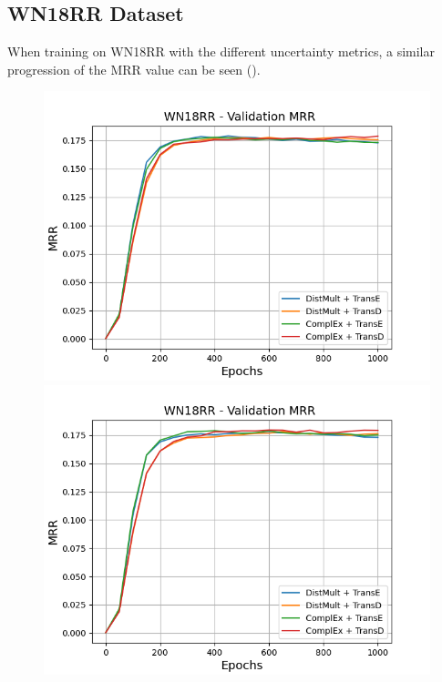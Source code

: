 \subsection{WN18RR Dataset}
\label{subsec:metrics_wn18rr}


When training \ucgan on \textsc{WN18RR} with the different uncertainty metrics, a similar progression of the MRR value can be seen ().
\begin{figure}
    \centering
    \begin{minipage}{.5\textwidth}
      \centering
      \includegraphics[width=0.9\linewidth]{figures/results/gan_train/not_pretrained/uncertainty/max_distribution/entropy/wn18rr/uncertainty_wn18rr_mrrs.png}
    \end{minipage}%
    \begin{minipage}{.5\textwidth}
      \centering
      \includegraphics[width=0.9\linewidth]{figures/results/gan_train/not_pretrained/uncertainty/max_distribution/least_confidence/wn18rr/uncertainty_wn18rr_mrrs.png}

\end{minipage}
\end{figure}
